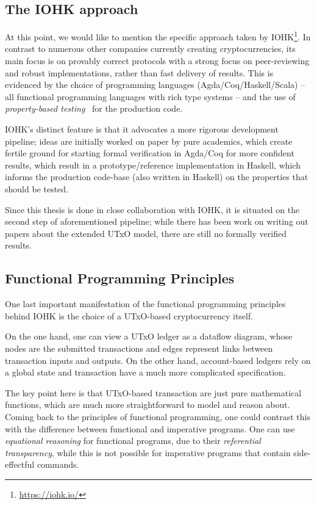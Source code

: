 \documentclass[acmsmall,nonacm=true,screen=true]{acmart}
\newcommand\site[1]{\footnote{\url{#1}}}
\begin{document}
\subsection{The IOHK approach}
At this point, we would like to mention the specific approach taken by IOHK\site{https://iohk.io/}.
In contrast to numerous other companies currently creating cryptocurrencies, its main focus
is on provably correct protocols with a strong focus on peer-reviewing and robust implementations, rather
than fast delivery of results.
This is evidenced by the choice of programming languages (Agda/Coq/Haskell/Scala)
-- all functional programming languages with rich type systems --
and the use of \textit{property-based testing}~\cite{quickcheck} for the production code.

IOHK's distinct feature is that it advocates a more rigorous development pipeline;
ideas are initially worked on paper by pure academics,
which create fertile ground for starting formal verification in Agda/Coq for more confident results, 
which result in a prototype/reference implementation in Haskell,
which informs the production code-base (also written in Haskell) on the properties that should be tested.

Since this thesis is done in close collaboration with IOHK, it is situated on the second step of aforementioned pipeline;
while there has been work on writing out papers about the extended UTxO model, there are still no formally verified results.

\subsection{Functional Programming Principles}
One last important manifestation of the functional programming principles behind IOHK is the choice
of a UTxO-based cryptocurrency itself.

On the one hand, one can view a UTxO ledger as a dataflow diagram, whose nodes are the submitted transactions
and edges represent links between transaction inputs and outputs.
On the other hand, account-based ledgers rely on a global state and transaction have a much more complicated
specification.

The key point here is that UTxO-based transaction are just pure mathematical functions, which are much more
straightforward to model and reason about.
Coming back to the principles of functional programming, one could contrast this with the difference between
functional and imperative programs.
One can use \textit{equational reasoning} for functional programs, due to their \textit{referential transparency},
while this is not possible for imperative programs that contain side-effectful commands.
\end{document}
